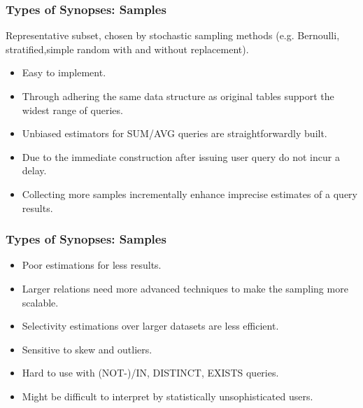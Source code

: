 \documentclass{beamer}
\begin{document}
\begin{frame}
\frametitle{Types of Synopses: Samples}
Representative subset, chosen by stochastic sampling methods (e.g. Bernoulli, stratified,simple random with and without replacement).\pause
\vspace{0.2 cm}
\begin{itemize}
\item{Easy to implement.}
\item{Through adhering the same data structure as original tables support the widest range of queries.}
\item{Unbiased estimators for SUM/AVG queries are straightforwardly built.}
\item{Due to the immediate construction after issuing user query do not incur a delay.}
\item{Collecting more samples incrementally enhance imprecise estimates of a query results.}
\end{itemize}
\end{frame}

\begin{frame}
\frametitle{Types of Synopses: Samples}
\begin{itemize}
\item{Poor estimations for less results.}
\item{Larger relations need more advanced techniques to make the sampling more scalable.}
\item{Selectivity estimations over larger datasets are less efficient.}
\item{Sensitive to skew and outliers.}
\item{Hard to use with (NOT-)/IN, DISTINCT, EXISTS queries.}
\item{Might be difficult to interpret by statistically unsophisticated users.}
\end{itemize}
\end{frame}
\end{document}
